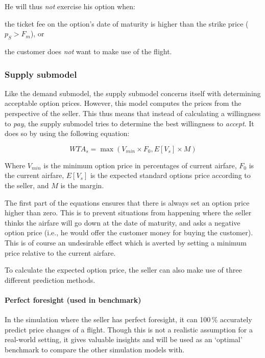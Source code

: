He will thus \emph{not} exercise his option when:
\begin{compactitem}
    \item the ticket fee on the option's date of maturity is higher than the strike price ($p_S > F_m$), or
    \item the customer does \emph{not} want to make use of the flight.
\end{compactitem}



\subsubsection{Supply submodel}
Like the demand submodel, the supply submodel concerns itself with determining acceptable option prices. However, this model computes the prices from the perspective of the seller. This thus means that instead of calculating a willingness to \emph{pay}, the supply submodel tries to determine the best willingness to \emph{accept}. It does so by using the following equation:

$$ WTA_s = \max(V_{min} \times F_0, E[V_s] \times M) $$

Where $V_{min}$ is the minimum option price in percentages of current airfare, $F_0$ is the current airfare, $E[V_s]$ is the expected standard options price according to the seller, and $M$ is the margin.

The first part of the equations ensures that there is always set an option price higher than zero. This is to prevent situations from happening where the seller thinks the airfare will go down at the date of maturity, and asks a negative option price (i.e., he would offer the customer money for buying the customer). This is of course an undesirable effect which is averted by setting a minimum price relative to the current airfare.

To calculate the expected option price, the seller can also make use of three different prediction methods.

\paragraph{Perfect foresight (used in benchmark)}
In the simulation where the seller has perfect foresight, it can 100\,\% accurately predict price changes of a flight. Though this is not a realistic assumption for a real-world setting, it gives valuable insights and will be used as an `optimal' benchmark to compare the other simulation models with.

